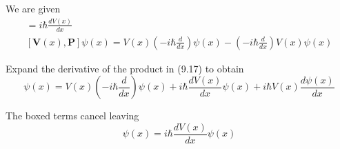 


\bigskip
We are given
\begin{gather*}
[\mathbf V(x),\mathbf P]=i\hbar\frac{dV(x)}{dx}\tag{9.16}
\\[1ex]
[\mathbf V(x),\mathbf P]\psi(x)=V(x)\left(-i\hbar\frac{d}{dx}\right)\psi(x)
-\left(-i\hbar\frac{d}{dx}\right)V(x)\psi(x)\tag{9.17}
\end{gather*}

Expand the derivative of the product in (9.17) to obtain
\begin{equation*}
[\mathbf V(x),\mathbf P]\psi(x)
=\boxed{V(x)\left(-i\hbar\frac{d}{dx}\right)\psi(x)}
+i\hbar\frac{dV(x)}{dx}\psi(x)+
\boxed{i\hbar V(x)\frac{d\psi(x)}{dx}}
\end{equation*}

The boxed terms cancel leaving
\begin{equation*}
[\mathbf V(x),\mathbf P]\psi(x)=i\hbar\frac{dV(x)}{dx}\psi(x)
\end{equation*}


